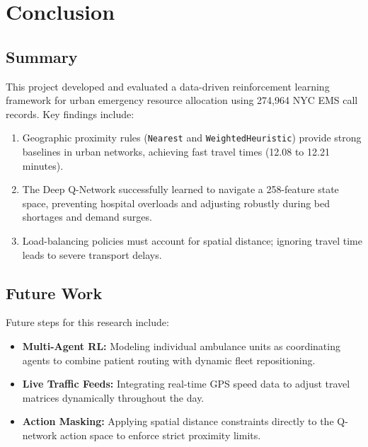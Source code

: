 \documentclass[11pt,a4paper]{article}
\begin{document}
\section{Conclusion}
\label{sec:conclusions}

\subsection{Summary}
This project developed and evaluated a data-driven reinforcement learning framework for urban emergency resource allocation using 274,964 NYC EMS call records. Key findings include:
\begin{enumerate}[leftmargin=*]
    \item Geographic proximity rules (\texttt{Nearest} and \texttt{WeightedHeuristic}) provide strong baselines in urban networks, achieving fast travel times (12.08 to 12.21 minutes).
    \item The Deep Q-Network successfully learned to navigate a 258-feature state space, preventing hospital overloads and adjusting robustly during bed shortages and demand surges.
    \item Load-balancing policies must account for spatial distance; ignoring travel time leads to severe transport delays.
\end{enumerate}

\subsection{Future Work}
Future steps for this research include:
\begin{itemize}[leftmargin=*]
    \item \textbf{Multi-Agent RL:} Modeling individual ambulance units as coordinating agents to combine patient routing with dynamic fleet repositioning.
    \item \textbf{Live Traffic Feeds:} Integrating real-time GPS speed data to adjust travel matrices dynamically throughout the day.
    \item \textbf{Action Masking:} Applying spatial distance constraints directly to the Q-network action space to enforce strict proximity limits.
\end{itemize}

\end{document}
